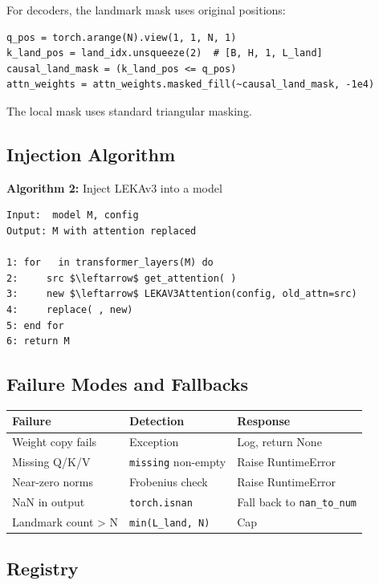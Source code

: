 For decoders, the landmark mask uses original positions:

\begin{lstlisting}
q_pos = torch.arange(N).view(1, 1, N, 1)
k_land_pos = land_idx.unsqueeze(2)  # [B, H, 1, L_land]
causal_land_mask = (k_land_pos <= q_pos)
attn_weights = attn_weights.masked_fill(~causal_land_mask, -1e4)
\end{lstlisting}

The local mask uses standard triangular masking.

\subsection{Injection Algorithm}

\textbf{Algorithm 2:} Inject LEKAv3 into a model
\begin{lstlisting}
Input:  model M, config
Output: M with attention replaced

1: for   in transformer_layers(M) do
2:     src $\leftarrow$ get_attention( )
3:     new $\leftarrow$ LEKAV3Attention(config, old_attn=src)
4:     replace( , new)
5: end for
6: return M
\end{lstlisting}

\subsection{Failure Modes and Fallbacks}

\begin{table}[H]
\centering
\small
\begin{tabular}{lll}
\toprule
\textbf{Failure} & \textbf{Detection} & \textbf{Response} \\
\midrule
Weight copy fails & Exception & Log, return None \\
Missing Q/K/V & \texttt{missing} non-empty & Raise RuntimeError \\
Near-zero norms & Frobenius check & Raise RuntimeError \\
NaN in output & \texttt{torch.isnan} & Fall back to \texttt{nan\_to\_num} \\
Landmark count > N & \texttt{min(L\_land, N)} & Cap \\
\bottomrule
\end{tabular}
\end{table}

\subsection{Registry}

